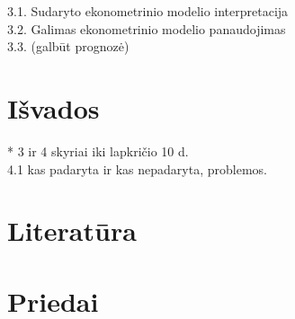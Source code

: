 \documentclass[a4paper]{article}
\begin{document}
	3.1. Sudaryto ekonometrinio modelio interpretacija\\


	3.2. Galimas ekonometrinio modelio panaudojimas\\

	3.3. (galbūt prognozė)\\

\section{Išvados}

* 3 ir 4 skyriai iki lapkričio 10 d. \\

	4.1 kas padaryta ir kas nepadaryta, problemos.\\

\section{Literatūra}
\section{Priedai}
	
\end{document}
